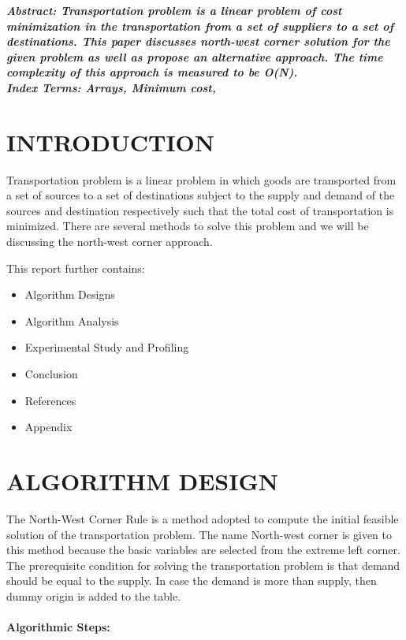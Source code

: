 \documentclass[10pt]{article}
\begin{document}
\begin{multicols*}{2}

    \textbf{\emph{{Abstract}: Transportation problem is a linear problem of cost minimization in the transportation from a set of suppliers to a set of destinations. This paper discusses north-west corner solution for the given problem as well as propose an alternative approach. The time complexity of this approach is measured to be O(N).}}\\
	
	\textbf{\emph{{Index Terms}: Arrays, Minimum cost, \\}}


\section*{INTRODUCTION}
 
Transportation problem is a linear problem in which goods are transported from a set of sources to a set of destinations subject to the supply and demand of the sources and destination respectively such that the total cost of transportation is minimized. There are several methods to solve this problem and we will be discussing the north-west corner approach.

This report further contains:
\begin{itemize}
\item 	Algorithm  Designs
\item 	Algorithm  Analysis
\item 	Experimental Study and Profiling
\item 	Conclusion
\item 	References
\item 	Appendix
\end{itemize}

\section*{ALGORITHM DESIGN}
The North-West Corner Rule is a method adopted to compute the initial feasible solution of the transportation problem. The name North-west corner is given to this method because the basic variables are selected from the extreme left corner. The prerequisite condition for solving the transportation problem is that demand should be equal to the supply. In case the demand is more than supply, then dummy origin is added to the table.

\paragraph{Algorithmic Steps:}


\end{multicols*}
\end{document}
